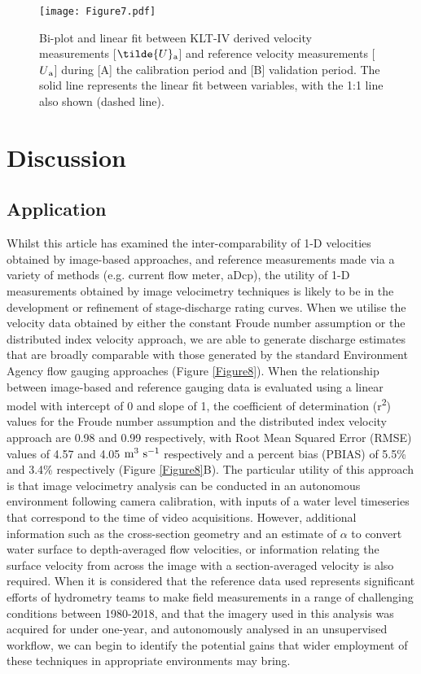 \documentclass[hess, manuscript]{copernicus} %
\begin{document}
\begin{figure}[!htb]
\centering 
\texttt{[image: Figure7.pdf]}
\caption{Bi-plot and linear fit between KLT-IV derived velocity measurements [$\tilde{U}\textsubscript{a}$] and reference velocity measurements [$U\textsubscript{a}$] during [A] the calibration period and [B] validation period. The solid line represents the linear fit between variables, with the 1:1 line also shown (dashed line).}
\label{Figure7} 
\end{figure}



\section{Discussion}
\subsection{Application}
Whilst this article has examined the inter-comparability of 1-D velocities obtained by image-based approaches, and reference measurements made via a variety of methods (e.g. current flow meter, aDcp), the utility of 1-D measurements obtained by image velocimetry techniques is likely to be in the development or refinement of stage-discharge rating curves. When we utilise the velocity data obtained by either the constant Froude number assumption or the distributed index velocity approach, we are able to generate discharge estimates that are broadly comparable with those generated by the standard Environment Agency flow gauging approaches (Figure \ref{Figure8}). When the relationship between image-based and reference gauging data is evaluated using a linear model with intercept of 0 and slope of 1, the coefficient of determination (r\textsuperscript{2}) values for the Froude number assumption and the distributed index velocity approach are 0.98 and 0.99 respectively, with Root Mean Squared Error (RMSE) values of 4.57 and 4.05 $\textnormal{m\textsuperscript{3} s\textsuperscript{-1}}$ respectively and a percent bias (PBIAS) of 5.5\% and 3.4\% respectively (Figure \ref{Figure8}B). The particular utility of this approach is that image velocimetry analysis can be conducted in an autonomous environment following camera calibration, with inputs of a water level timeseries that correspond to the time of video acquisitions. However, additional information such as the cross-section geometry and an estimate of $\alpha$ to convert water surface to depth-averaged flow velocities, or information relating the surface velocity from across the image with a section-averaged velocity is also required. When it is considered that the reference data used represents significant efforts of hydrometry teams to make field measurements in a range of challenging conditions between 1980-2018, and that the imagery used in this analysis was acquired for under one-year, and autonomously analysed in an unsupervised workflow, we can begin to identify the potential gains that wider employment of these techniques in appropriate environments may bring.
\end{document}
